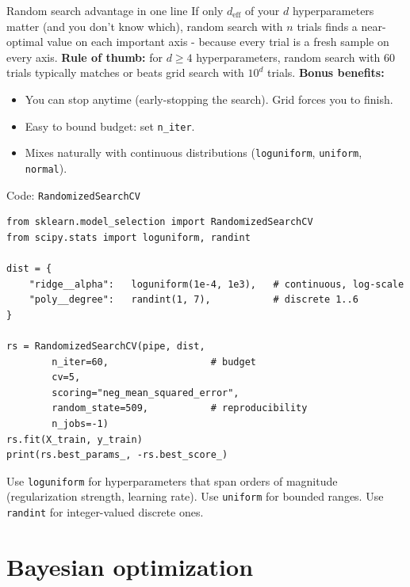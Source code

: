 \documentclass[aspectratio=169]{beamer}
\begin{document}
\begin{frame}{Random search advantage in one line}
  If only $d_{\text{eff}}$ of your $d$ hyperparameters matter (and you don't know which), random search with $n$ trials finds a near-optimal value on each important axis - because every trial is a fresh sample on every axis.
  \vfill
  \textbf{Rule of thumb:} for $d \geq 4$ hyperparameters, random search with $60$ trials typically matches or beats grid search with $10^d$ trials.
  \vfill
  \textbf{Bonus benefits:}
  \begin{itemize}
    \item You can stop anytime (early-stopping the search). Grid forces you to finish.
    \item Easy to bound budget: set \texttt{n\_iter}.
    \item Mixes naturally with continuous distributions (\texttt{loguniform}, \texttt{uniform}, \texttt{normal}).
  \end{itemize}
\end{frame}

\begin{frame}[fragile]{Code: \texttt{RandomizedSearchCV}}
\begin{lstlisting}
from sklearn.model_selection import RandomizedSearchCV
from scipy.stats import loguniform, randint

dist = {
    "ridge__alpha":   loguniform(1e-4, 1e3),   # continuous, log-scale
    "poly__degree":   randint(1, 7),           # discrete 1..6
}

rs = RandomizedSearchCV(pipe, dist,
        n_iter=60,                  # budget
        cv=5,
        scoring="neg_mean_squared_error",
        random_state=509,           # reproducibility
        n_jobs=-1)
rs.fit(X_train, y_train)
print(rs.best_params_, -rs.best_score_)
\end{lstlisting}
  \vfill
  \footnotesize Use \texttt{loguniform} for hyperparameters that span orders of magnitude (regularization strength, learning rate). Use \texttt{uniform} for bounded ranges. Use \texttt{randint} for integer-valued discrete ones.
\end{frame}

\section{Bayesian optimization}
\end{document}
